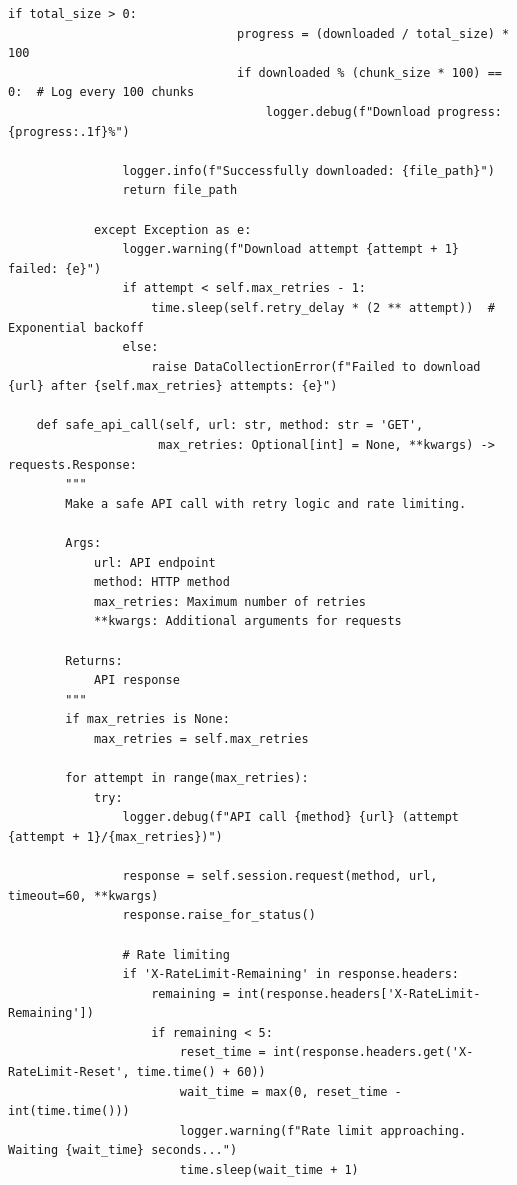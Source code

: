\documentclass[a4paper,11pt]{article}
\begin{document}
\begin{lstlisting}[style=pythonstyle]
                            if total_size > 0:
                                progress = (downloaded / total_size) * 100
                                if downloaded % (chunk_size * 100) == 0:  # Log every 100 chunks
                                    logger.debug(f"Download progress: {progress:.1f}%")
                
                logger.info(f"Successfully downloaded: {file_path}")
                return file_path
                
            except Exception as e:
                logger.warning(f"Download attempt {attempt + 1} failed: {e}")
                if attempt < self.max_retries - 1:
                    time.sleep(self.retry_delay * (2 ** attempt))  # Exponential backoff
                else:
                    raise DataCollectionError(f"Failed to download {url} after {self.max_retries} attempts: {e}")
    
    def safe_api_call(self, url: str, method: str = 'GET', 
                     max_retries: Optional[int] = None, **kwargs) -> requests.Response:
        """
        Make a safe API call with retry logic and rate limiting.
        
        Args:
            url: API endpoint
            method: HTTP method
            max_retries: Maximum number of retries
            **kwargs: Additional arguments for requests
            
        Returns:
            API response
        """
        if max_retries is None:
            max_retries = self.max_retries
        
        for attempt in range(max_retries):
            try:
                logger.debug(f"API call {method} {url} (attempt {attempt + 1}/{max_retries})")
                
                response = self.session.request(method, url, timeout=60, **kwargs)
                response.raise_for_status()
                
                # Rate limiting
                if 'X-RateLimit-Remaining' in response.headers:
                    remaining = int(response.headers['X-RateLimit-Remaining'])
                    if remaining < 5:
                        reset_time = int(response.headers.get('X-RateLimit-Reset', time.time() + 60))
                        wait_time = max(0, reset_time - int(time.time()))
                        logger.warning(f"Rate limit approaching. Waiting {wait_time} seconds...")
                        time.sleep(wait_time + 1)
                

\end{lstlisting}
\end{document}

